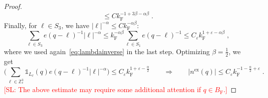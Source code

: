 \documentclass[12pt,a4paper]{article}
\numberwithin{equation}{section}
\newcommand{\1}{\mathbb{I}}
\newcommand{\ex}{\mathrm{ex}}
\newcommand{\F}{\mathrm{F}}
\newcommand{\Z}{\mathbb{Z}}
\theoremstyle{plain}
\theoremstyle{definition}
\theoremstyle{remark}
\theoremstyle{plain}
\theoremstyle{definition}
\theoremstyle{remark}
\begin{document}
\begin{proof}
\begin{equation}
	\le C k_{\F}^{-1 + 3 \beta - \alpha \beta} \;.
\end{equation}
Finally, for $ \ell \in S_3 $, we have $ |\ell|^{-\alpha} \le C k_{\F}^{-\alpha \beta} $:
\begin{equation}
	\sum_{\ell \in S_3} e(q-\ell)^{-1} |\ell|^{-\alpha}
	\le k_{\F}^{-\alpha \beta} \sum_{\ell \in S_1} e(q-\ell)^{-1}
	\le C_\varepsilon k_{\F}^{1 + \varepsilon - \alpha \beta} \;,
\end{equation}
where we used again~\eqref{eq:lambdainverse} in the last step. Optimizing $ \beta = \frac 12 $, we get
\begin{equation}
	\Bigg( \sum_{\ell \in \Z^3_*} \mathds{1}_{L_\ell}(q) e(q-\ell)^{-1} |\ell|^{-\alpha} \Bigg)
	\le C_\varepsilon k_{\F}^{1 + \varepsilon - \frac{\alpha}{2}} \qquad \Rightarrow \qquad
	|n^{\ex}(q)|
	\leq C_\varepsilon k_{\F}^{-1 - \frac{\alpha}{2} + \varepsilon} \;.
\end{equation}
\textcolor{red}{[SL: The above estimate may require some additional attention if $ q \in B_{\F} $.]}



\end{proof}
\end{document}
